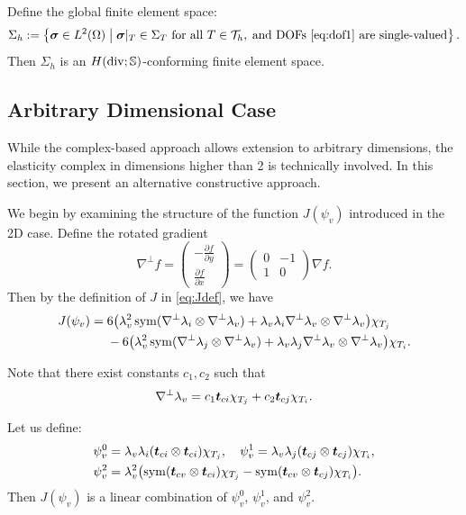 \documentclass[letterpaper,12pt]{article}
\begin{document}
Define the global finite element space:
$$
\Sigma_h := \left\{
\boldsymbol{\sigma} \in L^2(\Omega) \;\middle|\;
\boldsymbol{\sigma}|_T \in \Sigma_T \text{ for all } T \in \mathcal{T}_h,\;
\text{and DOFs \eqref{eq:dof1} are single-valued}
\right\}.
$$
Then $\Sigma_h$ is an $H(\mathop{\mathrm{div}}; \mathbb{S})$-conforming finite element space.


\subsection{Arbitrary Dimensional Case}

While the complex-based approach allows extension to arbitrary dimensions, the elasticity complex in dimensions higher than 2 is technically involved. In this section, we present an alternative constructive approach.

We begin by examining the structure of the function $J(\psi_v)$ introduced in the 2D case. Define the rotated gradient
$$
\nabla^{\perp}f = \begin{pmatrix}
-\frac{\partial f}{\partial y} \\ \frac{\partial f}{\partial x}
\end{pmatrix}
= 
\begin{pmatrix}
0 & -1\\ 1 & 0
\end{pmatrix} \nabla f.
$$
Then by the definition of $J$ in \eqref{eq:Jdef}, we have
\begin{align*}
J(\psi_v) =\; & 6\bigl(\lambda_v^2 \operatorname{sym}(\nabla^{\perp} \lambda_i \otimes \nabla^{\perp} \lambda_v) + \lambda_v \lambda_i \nabla^{\perp} \lambda_v \otimes \nabla^{\perp} \lambda_v\bigr) \chi_{T_j}\\
& - 6\bigl(\lambda_v^2 \operatorname{sym}(\nabla^{\perp} \lambda_j \otimes \nabla^{\perp} \lambda_v) + \lambda_v \lambda_j \nabla^{\perp} \lambda_v \otimes \nabla^{\perp} \lambda_v\bigr) \chi_{T_i}.
\end{align*}

Note that there exist constants $c_1, c_2$ such that
$$
\nabla^{\perp} \lambda_v = c_1 \boldsymbol{t}_{ci} \chi_{T_j} + c_2 \boldsymbol{t}_{cj} \chi_{T_i}.
$$

Let us define:
\begin{align*}
\psi_v^0 &= \lambda_v \lambda_i (\boldsymbol{t}_{ci} \otimes \boldsymbol{t}_{ci}) \chi_{T_j}, \quad
\psi_v^1 = \lambda_v \lambda_j (\boldsymbol{t}_{cj} \otimes \boldsymbol{t}_{cj}) \chi_{T_i},\\
\psi_v^2 &= \lambda_v^2 \bigl(\operatorname{sym}(\boldsymbol{t}_{cv} \otimes \boldsymbol{t}_{ci}) \chi_{T_j} - \operatorname{sym}(\boldsymbol{t}_{cv} \otimes \boldsymbol{t}_{cj}) \chi_{T_i}\bigr).
\end{align*}
Then $J(\psi_v)$ is a linear combination of $\psi_v^0$, $\psi_v^1$, and $\psi_v^2$.
\end{document}
